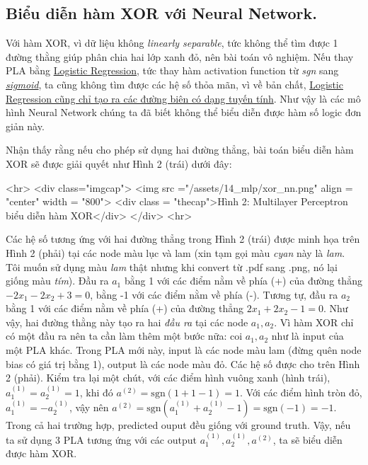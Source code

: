 { 
\subsection{Biểu diễn hàm XOR với Neural Network.}
 
Với hàm XOR, vì dữ liệu không \textit{linearly separable}, tức không thể tìm được 1 đường thằng giúp phân chia hai lớp xanh đỏ, nên bài toán vô nghiệm. Nếu thay PLA bằng \href{http://machinelearningcoban.com/2017/01/27/logisticregression/}{Logistic Regression}, tức thay hàm activation function từ \textit{sgn} sang \href{http://machinelearningcoban.com/2017/01/27/logisticregression/#sigmoid-function}{\textit{sigmoid}}, ta cũng không tìm được các hệ số thỏa mãn, vì về bản chất, \href{http://machinelearningcoban.com/2017/01/27/logisticregression/#boundary-tao-boi-logistic-regression-co-dang-tuyen-tinh}{Logistic Regression cũng chỉ tạo ra các đường biên có dạng tuyến tính}. Như vậy là các mô hình Neural Network chúng ta đã biết không thể biểu diễn được hàm số logic đơn giản này. 
 
Nhận thấy rằng nếu cho phép sử dụng hai đường thẳng, bài toán biểu diễn hàm XOR sẽ được giải quyết như Hình 2 (trái) dưới đây: 
 
<hr> 
<div class="imgcap"> 
 <img src ="/assets/14_mlp/xor_nn.png" align = "center" width = "800"> 
 <div class = "thecap">Hình 2: Multilayer Perceptron biểu diễn hàm XOR</div> 
</div> 
<hr> 
 
Các hệ số tương ứng với hai đường thẳng trong Hình 2 (trái) được minh họa trên Hình 2 (phải) tại các node màu lục và lam (xin tạm gọi màu \textit{cyan} này là \textit{lam}. Tôi muốn sử dụng màu \textit{lam} thật nhưng khi convert từ .pdf sang .png, nó lại giống màu \textit{tím}). Đầu ra $a_1$ bằng 1 với các điểm nằm về phía (+) của đường thẳng $-2x_1 -2x_2 +3 = 0$, bằng -1 với các điểm nằm về phía (-). Tương tự, đầu ra $a_2$ bằng 1 với các điểm nằm về phía (+) của đường thẳng $2x_1 + 2x_2 - 1 = 0$. Như vậy, hai đường thằng này tạo ra hai \textit{đầu ra} tại các node $a_1, a_2$. Vì hàm XOR chỉ có một đầu ra nên ta cần làm thêm một bước nữa: coi $a_1, a_2$ như là input của một PLA khác. Trong PLA mới này, input là các node màu lam (đừng quên node bias có giá trị bằng 1), output là các node màu đỏ. Các hệ số được cho trên Hình 2 (phải). Kiểm tra lại một chút, với các điểm hình vuông xanh (hình trái), $a^{(1)}_1 = a^{(1)}_2 = 1$, khi đó $a^{(2)} = \text{sgn}(1 + 1 - 1) = 1$. Với các điểm hình tròn đỏ, $a^{(1)}_1 = -a^{(1)}_2$, vậy nên $a^{(2)} = \text{sgn}(a^{(1)}_1 + a^{(1)}_2 - 1) = \text{sgn}(-1) = -1$. Trong cả hai trường hợp, predicted ouput đều giống với ground truth. Vậy, nếu ta sử dụng 3 PLA tương ứng với các output $a^{(1)}_1, a^{(1)}_2, a^{(2)}$, ta sẽ biểu diễn được hàm XOR. 
 
}

